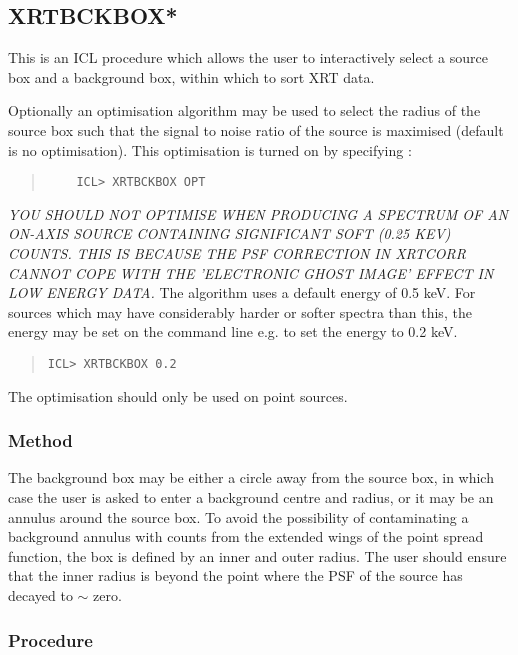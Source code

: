 \documentclass{book}
\renewcommand{\_}{{\tt\char'137}}     %
\begin{document}
\subsection{XRTBCKBOX*}
This is an ICL procedure which allows the user to interactively select
a source box and a background box, within which to sort XRT data.
 
Optionally an optimisation algorithm may be used to
select the radius of the source box such that the signal to noise ratio
of the source is maximised (default is no optimisation).
This optimisation is turned on by specifying :
 
\begin{quote}\begin{verbatim}
    ICL> XRTBCKBOX OPT
\end{verbatim}\end{quote}
{\em YOU SHOULD NOT OPTIMISE WHEN PRODUCING A SPECTRUM OF
AN ON-AXIS SOURCE CONTAINING SIGNIFICANT SOFT (0.25 KEV) COUNTS.
THIS IS BECAUSE THE PSF CORRECTION IN XRTCORR CANNOT COPE WITH THE
'ELECTRONIC GHOST IMAGE' EFFECT IN LOW ENERGY DATA.}
The algorithm uses a default energy of 0.5 keV. For sources which may have
considerably harder or softer spectra than this, the energy may be set
on the command line e.g. to set the energy to 0.2 keV.
 
\begin{quote}\begin{verbatim}
ICL> XRTBCKBOX 0.2
\end{verbatim}\end{quote}
The optimisation should only be used on point sources.
 
\subsubsection{Method}
The background box may be either a circle away from the source box,
in which case the user is asked to enter a background centre and
radius, or it may be an annulus around the source box. To avoid the
possibility of contaminating a background annulus with counts from
the extended wings of the point spread function, the box is defined
by an inner and outer radius. The user should ensure that the inner
radius is beyond the point where the PSF of the source has decayed to
$\sim$ zero.
 
\subsubsection{Procedure}
 
\end{document}
